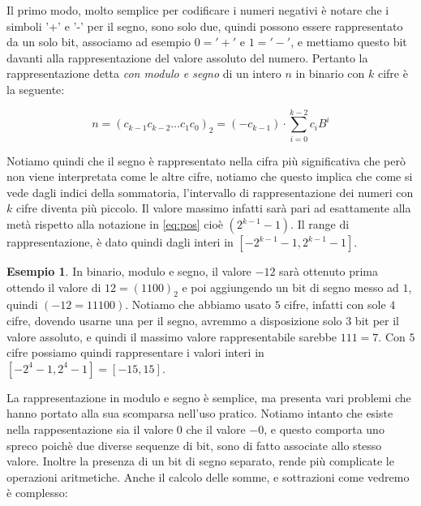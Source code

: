 \documentclass[a4paper]{book}
\theoremstyle{definition}
\newtheorem{ex}{Esempio}
\newcommand{\nota}[1]{\marginpar[{\raggedleft\small\sffamily #1\\}]{%
 								 {\raggedright\small\sffamily #1\\}}}
\begin{document}
Il primo modo, molto semplice per codificare i numeri negativi è notare che i simboli '+' e '-' per il segno, sono solo due, quindi possono essere rappresentato da un solo bit, associamo ad esempio $0 = '+'$ e $1 = '-'$, e mettiamo questo bit davanti alla rappresentazione del valore assoluto del numero. Pertanto la rappresentazione detta \emph{con modulo e segno} di un intero $n$ in binario con $k$ cifre è la seguente:

\[ n = (c_{k-1}c_{k-2}{\ldots}c_1c_0)_2 = (-c_{k-1}) \cdot \sum_{i=0}^{k-2}c_iB^i \]

Notiamo quindi che il segno è rappresentato nella cifra più significativa che però non viene interpretata come le altre cifre, notiamo che questo implica che come si vede dagli indici della sommatoria, l'intervallo di rappresentazione dei numeri con $k$ cifre diventa più piccolo. Il valore massimo infatti sarà pari ad esattamente alla metà rispetto alla notazione in \eqref{eq:pos} cioè $(2^{k-1}-1)$. Il range di rappresentazione\nota{Numeri Interi in Modulo e Segno, con $k$ bit: Range = $[-2^{k-1}-1,2^{k-1}-1]$}, è dato quindi dagli interi in $[-2^{k-1}-1,2^{k-1}-1]$.

\begin{ex} In binario, modulo e segno, il valore $-12$ sarà ottenuto prima
	ottendo il valore di $12 = (1100)_2$ e poi aggiungendo un bit di segno messo ad $1$, quindi $(-12 = 11100)$. Notiamo che abbiamo usato $5$ cifre,
	infatti con sole $4$ cifre, dovendo usarne una per il segno, avremmo a disposizione solo $3$ bit per il valore assoluto, e quindi il massimo valore
	rappresentabile sarebbe $111 = 7$. Con $5$ cifre possiamo quindi rappresentare i valori interi in $[-2^4-1,2^4-1] = [-15,15]$.
\end{ex}

La rappresentazione in modulo e segno è semplice, ma presenta vari problemi che hanno portato alla sua scomparsa nell'uso pratico. Notiamo intanto che esiste nella rappesentazione sia il valore $0$ che il valore $-0$, e questo comporta uno spreco poichè due diverse sequenze di bit, sono di fatto associate allo stesso valore. Inoltre la presenza di un bit di segno separato, rende più complicate le operazioni aritmetiche. Anche il calcolo delle somme, e sottrazioni come vedremo è complesso:
\end{document}
